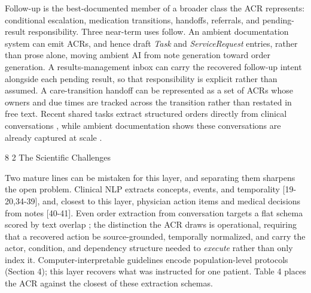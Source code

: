 \documentclass[3p,twocolumn]{elsarticle}
\makeatletter
\renewcommand\subsection{\@startsection{subsection}{2}{\z@}%
           {8\p@ \@plus 4\p@ \@minus 4\p@}%
           {2\p@ \@plus 4\p@ \@minus 3\p@}%
           {\normalfont\normalsize\itshape}}
\makeatother
\begin{document}
Follow-up is the best-documented member of a broader class the ACR represents: conditional escalation, medication transitions, handoffs, referrals, and pending-result responsibility. Three near-term uses follow. An ambient documentation system can emit ACRs, and hence draft \emph{Task} and \emph{ServiceRequest} entries, rather than prose alone, moving ambient AI from note generation toward order generation. A results-management inbox can carry the recovered follow-up intent alongside each pending result, so that responsibility is explicit rather than assumed. A care-transition handoff can be represented as a set of ACRs whose owners and due times are tracked across the transition rather than restated in free text. Recent shared tasks extract structured orders directly from clinical conversations \cite{ref32}, while ambient documentation shows these conversations are already captured at scale \cite{ref33}.

\subsection{The Scientific Challenges}\label{the-scientific-challenges}

Two mature lines can be mistaken for this layer, and separating them sharpens the open problem. Clinical NLP extracts concepts, events, and temporality {[}19-20,34-39{]}, and, closest to this layer, physician action items and medical decisions from notes {[}40-41{]}. Even order extraction from conversation targets a flat schema scored by text overlap \cite{ref32}; the distinction the ACR draws is operational, requiring that a recovered action be source-grounded, temporally normalized, and carry the actor, condition, and dependency structure needed to \emph{execute} rather than only index it. Computer-interpretable guidelines encode population-level protocols (Section 4); this layer recovers what was instructed for one patient. Table 4 places the ACR against the closest of these extraction schemas.
\end{document}
